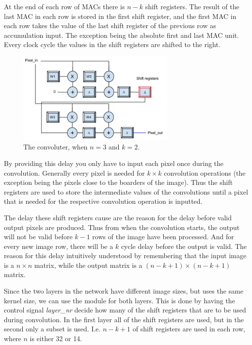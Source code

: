 At the end of each row of MACs there is $ n - k $ shift registers. The result of the last MAC in each row is stored in the first shift register, and the first MAC in each row takes the value of the last shift register of the previous row as accumulation input. The exception being the absolute first and last MAC unit. Every clock cycle the values in the shift registers are shifted to the right. 

\begin{figure}[h!]
  \centering
      \includegraphics[width=0.7\textwidth]{Figures/Method/Convolver}
  \caption[The convoluter ]{The convoluter, when $ n = 3 $ and $ k = 2 $.}
\end{figure}
	
By providing this delay you only have to input each pixel once during the convolution. Generally every pixel is needed for $ k \times k $ convolution operations (the exception being the pixels close to the boarders of the image). Thus the shift registers are used to store the intermediate values of the convolutions until a pixel that is needed for the respective convolution operation is inputted. 

The delay these shift registers cause are the reason for the delay before valid output pixels are produced. Thus from when the convolution starts, the output will not be valid before $ k-1 $ rows of the image have been processed. And for every new image row, there will be a $ k $ cycle delay before the output is valid. The reason for this delay intuitively understood by remembering that the input image is a $ n \times n $ matrix, while the output matrix is a $ (n-k+1) \times (n-k+1) $ matrix. 

Since the two layers in the network have different image sizes, but uses the same kernel size, we can use the module for both layers. This is done by having the control signal \textit{layer\_nr} decide how many of the shift registers that are to be used during convolution. In the first layer all of the shift registers are used, but in the second only a subset is used. I.e. $ n-k+1 $ of shift registers are used in each row, where $ n $ is either 32 or 14. 

